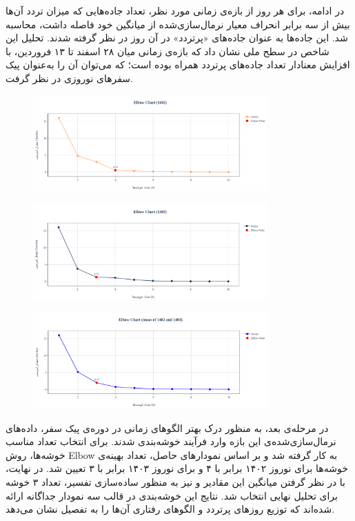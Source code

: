\documentclass[a4paper, 12pt]{article}
\begin{document}
\medskip
در ادامه، برای هر روز از بازه‌ی زمانی مورد نظر، تعداد جاده‌هایی که میزان تردد آن‌ها بیش از سه برابر انحراف معیار نرمال‌سازی‌شده از میانگین خود فاصله داشت، محاسبه شد. این جاده‌ها به عنوان جاده‌های «پرتردد» در آن روز در نظر گرفته شدند. تحلیل این شاخص در سطح ملی نشان داد که بازه‌ی زمانی میان ۲۸ اسفند تا ۱۳ فروردین، با افزایش معنادار تعداد جاده‌های پرتردد همراه بوده است؛ که می‌توان آن را به‌عنوان پیک سفرهای نوروزی در نظر گرفت.

\begin{figure}[H]
    \centering
    \includegraphics[width=0.8\textwidth]{peaks-pics/elbow1402.png}
\end{figure}

\begin{figure}[H]
    \centering
    \includegraphics[width=0.8\textwidth]{peaks-pics/elbow1403.png}
\end{figure}

\begin{figure}[H]
    \centering
    \includegraphics[width=0.8\textwidth]{peaks-pics/elbowmean.png}
\end{figure}

در مرحله‌ی بعد، به منظور درک بهتر الگوهای زمانی در دوره‌ی پیک سفر، داده‌های نرمال‌سازی‌شده‌ی این بازه وارد فرآیند خوشه‌بندی شدند. برای انتخاب تعداد مناسب خوشه‌ها، روش Elbow به کار گرفته شد و بر اساس نمودارهای حاصل، تعداد بهینه‌ی خوشه‌ها برای نوروز ۱۴۰۲ برابر با ۴ و برای نوروز ۱۴۰۳ برابر با ۳ تعیین شد. در نهایت، با در نظر گرفتن میانگین این مقادیر و نیز به منظور ساده‌سازی تفسیر، تعداد ۳ خوشه برای تحلیل نهایی انتخاب شد. نتایج این خوشه‌بندی در قالب سه نمودار جداگانه ارائه شده‌اند که توزیع روزهای پرتردد و الگوهای رفتاری آن‌ها را به تفصیل نشان می‌دهد.
\end{document}
